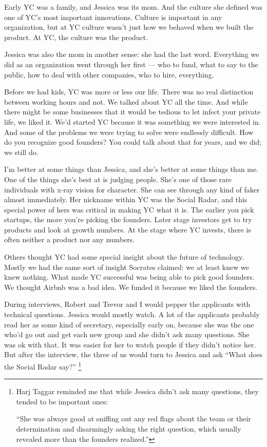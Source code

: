 \documentclass[12pt]{book}
\begin{document}
Early YC was a family, and Jessica was its mom. And the culture she
defined was one of YC's most important innovations. Culture is important
in any organization, but at YC culture wasn't just how we behaved when
we built the product. At YC, the culture was the product.

Jessica was also the mom in another sense: she had the last word.
Everything we did as an organization went through her first --- who to
fund, what to say to the public, how to deal with other companies, who
to hire, everything.

Before we had kids, YC was more or less our life. There was no real
distinction between working hours and not. We talked about YC all the
time. And while there might be some businesses that it would be tedious
to let infect your private life, we liked it. We'd started YC because it
was something we were interested in. And some of the problems we were
trying to solve were endlessly difficult. How do you recognize good
founders? You could talk about that for years, and we did; we still do.

I'm better at some things than Jessica, and she's better at some things
than me. One of the things she's best at is judging people. She's one of
those rare individuals with x-ray vision for character. She can see
through any kind of faker almost immediately. Her nickname within YC was
the Social Radar, and this special power of hers was critical in making
YC what it is. The earlier you pick startups, the more you're picking
the founders. Later stage investors get to try products and look at
growth numbers. At the stage where YC invests, there is often neither a
product nor any numbers.

Others thought YC had some special insight about the future of
technology. Mostly we had the same sort of insight Socrates claimed: we
at least knew we knew nothing. What made YC successful was being able to
pick good founders. We thought Airbnb was a bad idea. We funded it
because we liked the founders.

During interviews, Robert and Trevor and I would pepper the applicants
with technical questions. Jessica would mostly watch. A lot of the
applicants probably read her as some kind of secretary, especially early
on, because she was the one who'd go out and get each new group and she
didn't ask many questions. She was ok with that. It was easier for her
to watch people if they didn't notice her. But after the interview, the
three of us would turn to Jessica and ask ``What does the Social Radar
say?'' \footnote{Harj Taggar reminded me that while Jessica didn't ask many
questions, they tended to be important ones:

``She was always good at sniffing out any red flags about the team or
their determination and disarmingly asking the right question, which
usually revealed more than the founders realized.''}
\end{document}
